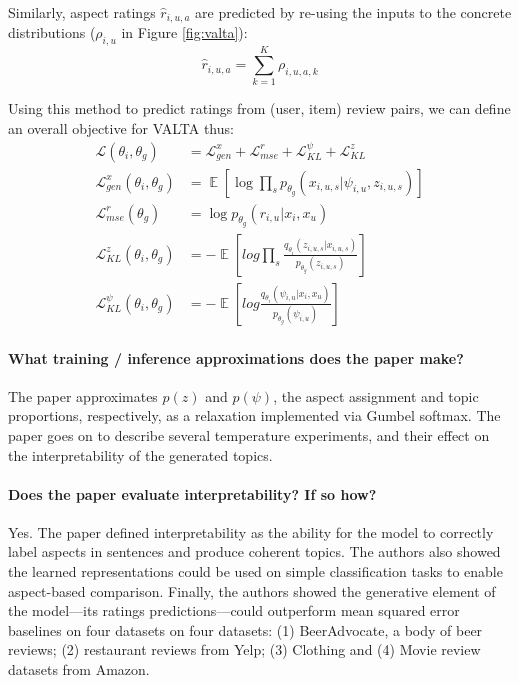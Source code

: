 \documentclass[11pt]{article}
\DeclareMathOperator*{\E}{\mathbb{E}}
\begin{document}
Similarly, aspect ratings $\hat{r}_{i,u,a}$ are predicted by re-using the inputs to the concrete distributions ($\rho_{i,u}$ in Figure \ref{fig:valta}):
$$\hat{r}_{i,u,a} = \sum_{k=1}^{K} \rho_{i,u,a,k}$$

Using this method to predict ratings from (user, item) review pairs, we can define an overall objective for VALTA thus:
\begin{align*}
\mathcal{L}(\theta_i,\theta_g) &= \mathcal{L}_{gen}^x + \mathcal{L}_{mse}^{r}+\mathcal{L}_{KL}^{\psi}+\mathcal{L}_{KL}^{z} \\
\mathcal{L}_{gen}^x(\theta_i,\theta_g) &= \E[\log \prod_s p_{\theta_g}(x_{i,u,s}|\psi_{i,u},z_{i,u,s})] \\
\mathcal{L}_{mse}^{r}(\theta_g) &= \log p_{\theta_g}(r_{i,u}|x_i,x_u) \\
\mathcal{L}_{KL}^{z}(\theta_i,\theta_g) &= -\E[log\prod_s \frac{q_{\theta_i}(z_{i,u,s}|x_{i,u,s})}{p_{\theta_g}(z_{i,u,s})}] \\ 
\mathcal{L}_{KL}^{\psi}(\theta_i,\theta_g) &= -\E[log \frac{q_{\theta_i}(\psi_{i,u}|x_i, x_u)}{p_{\theta_g}(\psi_{i,u})}]
\end{align*}


\paragraph{What training / inference approximations does the paper make?} The paper approximates $p(z)$ and $p(\psi)$, the aspect assignment and topic proportions, respectively, as a relaxation implemented via Gumbel softmax. The paper goes on to describe several temperature experiments, and their effect on the interpretability of the generated topics.

\paragraph{Does the paper evaluate interpretability? If so how?} Yes. The paper defined interpretability as the ability for the model to correctly label aspects in sentences and produce coherent topics. The authors also showed the learned representations could be used on simple classification tasks to enable aspect-based comparison. Finally, the authors showed the generative element of the model---its ratings predictions---could outperform mean squared error baselines on four datasets on four datasets: (1) BeerAdvocate, a body of beer reviews; (2) restaurant reviews from Yelp; (3) Clothing and (4) Movie review datasets from Amazon. 
\end{document}
